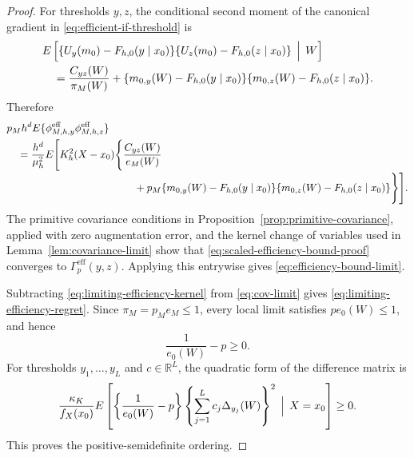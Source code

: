 \begin{proof}
For thresholds \(y,z\), the conditional second moment of the canonical gradient in \eqref{eq:efficient-if-threshold} is
\begin{align*}
&E\left[
\{U_y(m_0)-F_{h,0}(y\mid x_0)\}
\{U_z(m_0)-F_{h,0}(z\mid x_0)\}
\,\Bigm|\,W
\right]\\
&\quad=
\frac{C_{yz}(W)}{\pi_M(W)}
+
\{m_{0,y}(W)-F_{h,0}(y\mid x_0)\}
 \{m_{0,z}(W)-F_{h,0}(z\mid x_0)\}.
\end{align*}
Therefore
\begin{align}
&p_Mh^dE\{\phi_{M,h,y}^{\mathrm{eff}}
             \phi_{M,h,z}^{\mathrm{eff}}\}
\nonumber\\
&\quad=
\frac{h^d}{\mu_h^2}
E\Bigg[
K_h^2(X-x_0)
\Bigg\{
\frac{C_{yz}(W)}{e_M(W)}
\nonumber\\[-2pt]
&\hspace{43mm}
+
p_M\{m_{0,y}(W)-F_{h,0}(y\mid x_0)\}
      \{m_{0,z}(W)-F_{h,0}(z\mid x_0)\}
\Bigg\}
\Bigg].
\label{eq:scaled-efficiency-bound-proof}
\end{align}
The primitive covariance conditions in Proposition~\ref{prop:primitive-covariance}, applied with zero augmentation error, and the kernel change of variables used in Lemma~\ref{lem:covariance-limit} show that \eqref{eq:scaled-efficiency-bound-proof} converges to \(\Gamma_p^{\mathrm{eff}}(y,z)\). Applying this entrywise gives \eqref{eq:efficiency-bound-limit}.

Subtracting \eqref{eq:limiting-efficiency-kernel} from \eqref{eq:cov-limit} gives \eqref{eq:limiting-efficiency-regret}. Since \(\pi_M=p_Me_M\le1\), every local limit satisfies \(pe_0(W)\le1\), and hence
\[
\frac1{e_0(W)}-p\ge0.
\]
For thresholds \(y_1,\ldots,y_L\) and \(c\in\mathbb R^L\), the quadratic form of the difference matrix is
\[
\frac{\kappa_K}{f_X(x_0)}
E\left[
\left\{\frac1{e_0(W)}-p\right\}
\left\{\sum_{j=1}^Lc_j\Delta_{y_j}(W)\right\}^2
\,\Bigm|\,X=x_0
\right]
\ge0.
\]
This proves the positive-semidefinite ordering.
\end{proof}
